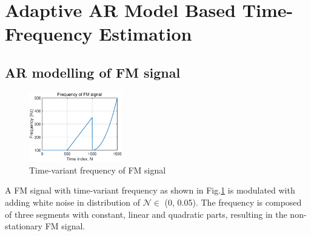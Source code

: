 \section{Adaptive AR Model Based Time-Frequency Estimation}
\subsection{AR modelling of FM signal}
\begin{figure}[htb]
	\centering
    \includegraphics[width=0.36\textwidth]{fig/32/32a1.eps}
    \caption{Time-variant frequency of FM signal}
    \label{fig:3_2_a1}
\end{figure}
\noindent
A FM signal with time-variant frequency as shown in Fig.\ref{fig:3_2_a1} is modulated with adding white noise in distribution of $\mathcal N\in$ (0, 0.05). The frequency is composed of three segments with constant, linear and quadratic parts, resulting in the non-stationary FM signal.
